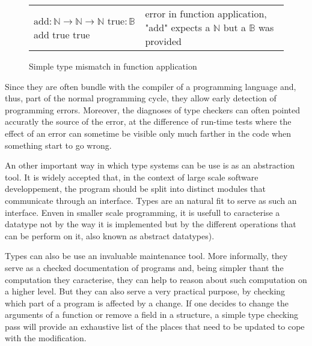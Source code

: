 \begin{figure}[h]
  \begin{center}
    \begin{tabular}{m{3.5cm} | m{5.5cm}}
      $\text{add} : \mathbb{N} \to \mathbb{N} \to \mathbb{N}$ \newline
      $\text{true} : \mathbb{B}$ \newline
      add true true
      & error in function application, "add" expects a $\mathbb{N}$ but a $\mathbb{B}$ was provided
    \end{tabular}
  \end{center}
  \caption{Simple type mismatch in function application}
  \label{fig:simple-type-mismatch}
\end{figure}

Since they are often bundle with the compiler of a programming language and, thus, part of the
normal programming cycle, they allow early detection of programming errors. Moreover, the diagnoses
of type checkers can often pointed accuratly the source of the error, at the difference of run-time
tests where the effect of an error can sometime be visible only much farther in the code when
something start to go wrong.

An other important way in which type systems can be use is as an abstraction tool. It is widely
accepted that, in the context of large scale software developpement, the program should be split
into distinct modules that communicate through an interface. Types are an natural fit to serve as
such an interface. Enven in smaller scale programming, it is usefull to caracterise a datatype not
by the way it is implemented but by the different operations that can be perform on it, also known
as abstract datatypes).

Types can also be use an invaluable maintenance tool. More informally, they serve as a checked
documentation of programs and, being simpler thant the computation they caracterise, they can help
to reason about such computation on a higher level. But they can also serve a very practical
purpose, by checking which part of a program is affected by a change. If one decides to change the
arguments of a function or remove a field in a structure, a simple type checking pass will provide
an exhaustive list of the places that need to be updated to cope with the modification.


